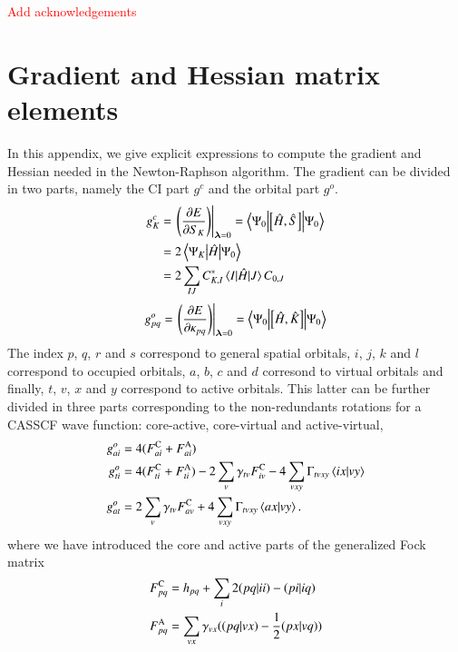 \documentclass[aps,prb,reprint,showkeys,superscriptaddress]{revtex4-1}
\newcommand{\todo}[1]{\textcolor{red}{#1}}
\begin{document}
\begin{acknowledgements}
\todo{Add acknowledgements}
\end{acknowledgements}

\appendix

\section{Gradient and Hessian matrix elements}
\label{app:appendixA}

In this appendix, we give explicit expressions to compute the gradient and Hessian needed in the Newton-Raphson algorithm.
The gradient can be divided in two parts, namely the CI part $g^c$ and the orbital part $g^o$.
\begin{align}
  \label{eq:CASSCF_CI_Gradient}
  g^c_{K} &= \eval{\mleft(\pdv{E}{S_{K}}\mright)}_{\bm{\lambda}=0} = \mel**{\Psi_0}{\com{\hH}{\hS}}{\Psi_0} \\
          &= 2\mel**{\Psi_K}{\hH}{\Psi_0} \notag \\
          &= 2\sum_{IJ}C_{K,I}^*\mel{I}{\hH}{J}C_{0,J} \notag
\end{align}
\begin{equation}
  \label{eq:CASSCF_Orb_Gradient_general}
  g^o_{pq} = \eval{\mleft(\pdv{E}{\kappa_{pq}}\mright)}_{\bm{\lambda}=0} = \mel**{\Psi_0}{\com{\hH}{\hK}}{\Psi_0}
\end{equation}
The index $p$, $q$, $r$ and $s$ correspond to general spatial orbitals, $i$, $j$, $k$ and $l$ correspond to occupied orbitals, $a$, $b$, $c$ and $d$ corresond to virtual orbitals and finally, $t$, $v$, $x$ and $y$ correspond to active orbitals.
This latter can be further divided in three parts corresponding to the non-redundants rotations for a CASSCF wave function: core-active, core-virtual and active-virtual,
\begin{subequations}
  \label{eq:CASSCF_Orb_Gradient}
  \begin{align}
    g^o_{ai} &= 4(F_{ai}^{\text{C}} + F_{ai}^{\text{A}}) \\
    g^o_{ti} &= 4(F_{ti}^{\text{C}} + F_{ti}^{\text{A}}) - 2\sum_v \gamma_{tv}F_{iv}^{\text{C}} -4\sum_{vxy}\Gamma_{tvxy}\braket{ix}{vy} \\
    g^o_{at} &= 2\sum_v \gamma_{tv}F_{av}^{\text{C}} + 4\sum_{vxy}\Gamma_{tvxy}\braket{ax}{vy}.
  \end{align}
\end{subequations}
where we have introduced the core and active parts of the generalized Fock matrix
\begin{align}
  \label{eq:CoreActGeneralizedFock}
  \FC{pq} &= h_{pq} + \sum_{i} 2\ceri{pq}{ii} - \ceri{pi}{iq} \\
  \FA{pq} &= \sum_{vx}\gamma_{vx}(\ceri{pq}{vx} - \frac{1}{2}\ceri{px}{vq})
\end{align}
\end{document}

